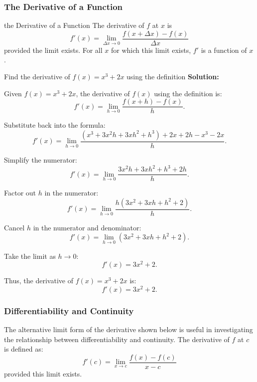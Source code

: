 \documentclass[12pt]{article}
\theoremstyle{beautifulthm}
\begin{document}
\newpage

\subsubsection{The Derivative of a Function}
\begin{Definition}{the Derivative of a Function}{}
The derivative of \(f\) at \(x\) is
\[
f'(x) = \lim_{\Delta x \to 0} \frac{f(x + \Delta x) - f(x)}{\Delta x}
\]
provided the limit exists. For all \(x\) for which this limit exists, \(f'\) is a function of \(x\).
\end{Definition}



\begin{tcolorbox}[colback=examplebg, colframe=red!75!black, title=\textbf{EXAMPLE 2: Finding the Derivative using the definition}, fonttitle=\bfseries, sharp corners]
Find the derivative of \(f(x) = x^3 + 2x\) using the definition
\tcblower
\textbf{Solution:}

Given \(f(x) = x^3 + 2x\), the derivative of \(f(x)\) using the definition is:
\[
f'(x) = \lim_{h \to 0} \frac{f(x + h) - f(x)}{h}.
\]

Substitute back into the formula:
\[
f'(x) = \lim_{h \to 0} \frac{(x^3 + 3x^2h + 3xh^2 + h^3) + 2x + 2h - x^3 - 2x}{h}.
\]

Simplify the numerator:
\[
f'(x) = \lim_{h \to 0} \frac{3x^2h + 3xh^2 + h^3 + 2h}{h}.
\]

Factor out \(h\) in the numerator:
\[
f'(x) = \lim_{h \to 0} \frac{h(3x^2 + 3xh + h^2 + 2)}{h}.
\]

Cancel \(h\) in the numerator and denominator:
\[
f'(x) = \lim_{h \to 0} (3x^2 + 3xh + h^2 + 2).
\]

Take the limit as \(h \to 0\):
\[
f'(x) = 3x^2 + 2.
\]

Thus, the derivative of \(f(x) = x^3 + 2x\) is:
\[
f'(x) = 3x^2 + 2.
\]
\end{tcolorbox}

\newpage
\subsubsection{Differentiability and Continuity}

The alternative limit form of the derivative shown below is useful in investigating the relationship between differentiability and continuity. The derivative of \(f\) at \(c\) is defined as:
\[
f'(c) = \lim_{x \to c} \frac{f(x) - f(c)}{x - c}
\]
provided this limit exists.
\end{document}
